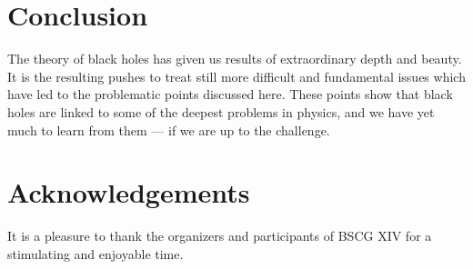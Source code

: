 \documentclass[12pt]{article}
\begin{document}
\section{Conclusion}

The theory of black holes has given us results of extraordinary depth and beauty.  It is the resulting pushes to
treat still more difficult and fundamental issues which have led to the problematic points discussed here.  These points show that black holes are linked to some of the deepest problems in physics, and we have yet much to learn from them --- if we are up to the challenge.

\section{Acknowledgements}
It is a pleasure to thank the organizers and participants of BSCG XIV for a stimulating and enjoyable time.



%
\end{document}
